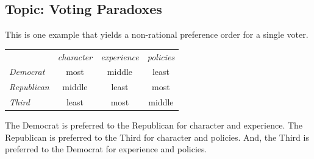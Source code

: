 \subsection{Topic: Voting Paradoxes}
\begin{ans}{1}
      This is one example that yields a non-rational preference order for a
      single voter.
      \begin{center}
        \begin{tabular}{l|c|c|c|}
             \multicolumn{1}{c}{\ }
                  &\multicolumn{1}{c}{\textit{character}}
                  &\multicolumn{1}{c}{\textit{experience}}
                  &\multicolumn{1}{c}{\textit{policies}}   \\
          \cline{2-4}
         \textit{Democrat}   &most    &middle  &least   \\
         \textit{Republican} &middle  &least   &most    \\
         \textit{Third}      &least   &most    &middle  \\
          \cline{2-4}
        \end{tabular}
      \end{center}
      The Democrat is preferred to the Republican for character and
      experience.
      The Republican is preferred to the Third for character and policies.
      And, the Third is preferred to the Democrat for experience and policies.
    
\end{ans}
